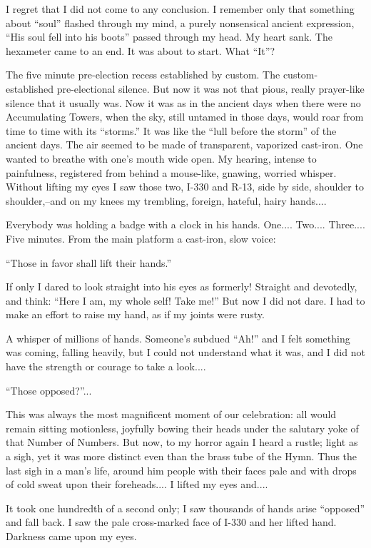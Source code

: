 \documentclass[11pt,openany]{book}
\begin{document}
I regret that I did not come to any conclusion. I remember only that something about ``soul'' flashed through my mind, a purely nonsensical ancient expression, ``His soul fell into his boots'' passed through my head. My heart sank. The hexameter came to an end. It was about to start. What ``It''?

The five minute pre-election recess established by custom. The custom-established pre-electional silence. But now it was not that pious, really prayer-like silence that it usually was. Now it was as in the ancient days when there were no Accumulating Towers, when the sky, still untamed in those days, would roar from time to time with its ``storms.'' It was like the ``lull before the storm'' of the ancient days. The air seemed to be made of transparent, vaporized cast-iron. One wanted to breathe with one's mouth wide open. My hearing, intense to painfulness, registered from behind a mouse-like, gnawing, worried whisper. Without lifting my eyes I saw those two, I-330 and R-13, side by side, shoulder to shoulder,--and on my knees my trembling, foreign, hateful, hairy hands....

Everybody was holding a badge with a clock in his hands. One.... Two.... Three.... Five minutes. From the main platform a cast-iron, slow voice:

``Those in favor shall lift their hands.''

If only I dared to look straight into his eyes as formerly! Straight and devotedly, and think: ``Here I am, my whole self! Take me!'' But now I did not dare. I had to make an effort to raise my hand, as if my joints were rusty.

A whisper of millions of hands. Someone's subdued ``Ah!'' and I felt something was coming, falling heavily, but I could not understand what it was, and I did not have the strength or courage to take a look....

``Those opposed?''...

This was always the most magnificent moment of our celebration: all would remain sitting motionless, joyfully bowing their heads under the salutary yoke of that Number of Numbers. But now, to my horror again I heard a rustle; light as a sigh, yet it was more distinct even than the brass tube of the Hymn. Thus the last sigh in a man's life, around him people with their faces pale and with drops of cold sweat upon their foreheads.... I lifted my eyes and....

It took one hundredth of a second only; I saw thousands of hands arise ``opposed'' and fall back. I saw the pale cross-marked face of I-330 and her lifted hand. Darkness came upon my eyes.
\end{document}
